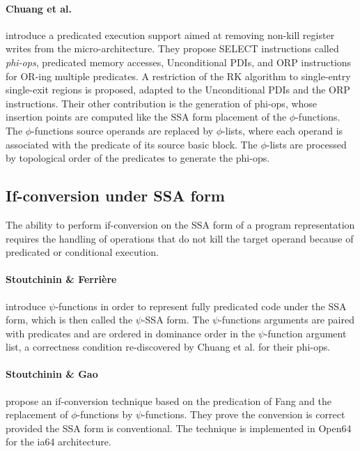 \paragraph{Chuang et al. \cite{Chuang:2003:CGO}} introduce a predicated execution
support aimed at removing non-kill register writes from the micro-architecture.
They propose SELECT instructions called \emph{phi-ops}, predicated memory
accesses, Unconditional PDIs, and ORP instructions for OR-ing multiple
predicates. A restriction of the RK algorithm to single-entry single-exit
regions is proposed, adapted to the Unconditional PDIs and the ORP instructions.
Their other contribution is the generation of {phi-ops}, whose insertion points
are computed like the SSA form placement of the $\phi$-functions. The
$\phi$-functions source operands are replaced by $\phi$-lists, where each
operand is associated with the predicate of its source basic block. The
$\phi$-lists are processed by topological order of the predicates to
generate the {phi-ops}.


\subsection{If-conversion under SSA form}

The ability to perform if-conversion on the SSA form of a program representation
requires the handling of operations that do not kill the target operand because
of predicated or conditional execution.


\paragraph{Stoutchinin \& Ferri\`ere \cite{Stoutchinin:2001:MICRO}} introduce
$\psi$-functions in order to represent fully predicated code under the SSA form,
which is then called the $\psi$-SSA form.  The $\psi$-functions arguments are
paired with predicates and are ordered in dominance order in the $\psi$-function
argument list, a correctness condition re-discovered by Chuang et al.
\cite{Chuang:2003:CGO} for their phi-ops.

\paragraph{Stoutchinin \& Gao \cite{Stoutchinin:2004:EuroPar}} propose an
if-conversion technique based on the predication of Fang \cite{Fang:1996:LCPC}
and the replacement of $\phi$-functions by $\psi$-functions. They prove the
conversion is correct provided the SSA form is conventional. The technique is
implemented in Open64 for the ia64 architecture.


